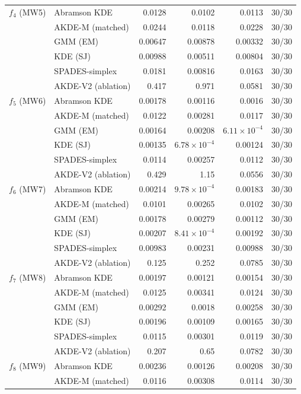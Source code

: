 \begin{tabular}{llrrrr}
$f_{4}$ (MW5) & Abramson KDE & 0.0128 & 0.0102 & 0.0113 & 30/30 \\
 & AKDE-M (matched) & 0.0244 & 0.0118 & 0.0228 & 30/30 \\
 & GMM (EM) & 0.00647 & 0.00878 & 0.00332 & 30/30 \\
 & KDE (SJ) & 0.00988 & 0.00511 & 0.00804 & 30/30 \\
 & SPADES-simplex & 0.0181 & 0.00816 & 0.0163 & 30/30 \\
 & AKDE-V2 (ablation) & 0.417 & 0.971 & 0.0581 & 30/30 \\
$f_{5}$ (MW6) & Abramson KDE & 0.00178 & 0.00116 & 0.0016 & 30/30 \\
 & AKDE-M (matched) & 0.0122 & 0.00281 & 0.0117 & 30/30 \\
 & GMM (EM) & 0.00164 & 0.00208 & $6.11\times10^{-4}$ & 30/30 \\
 & KDE (SJ) & 0.00135 & $6.78\times10^{-4}$ & 0.00124 & 30/30 \\
 & SPADES-simplex & 0.0114 & 0.00257 & 0.0112 & 30/30 \\
 & AKDE-V2 (ablation) & 0.429 & 1.15 & 0.0556 & 30/30 \\
$f_{6}$ (MW7) & Abramson KDE & 0.00214 & $9.78\times10^{-4}$ & 0.00183 & 30/30 \\
 & AKDE-M (matched) & 0.0101 & 0.00265 & 0.0102 & 30/30 \\
 & GMM (EM) & 0.00178 & 0.00279 & 0.00112 & 30/30 \\
 & KDE (SJ) & 0.00207 & $8.41\times10^{-4}$ & 0.00192 & 30/30 \\
 & SPADES-simplex & 0.00983 & 0.00231 & 0.00988 & 30/30 \\
 & AKDE-V2 (ablation) & 0.125 & 0.252 & 0.0785 & 30/30 \\
$f_{7}$ (MW8) & Abramson KDE & 0.00197 & 0.00121 & 0.00154 & 30/30 \\
 & AKDE-M (matched) & 0.0125 & 0.00341 & 0.0124 & 30/30 \\
 & GMM (EM) & 0.00292 & 0.0018 & 0.00258 & 30/30 \\
 & KDE (SJ) & 0.00196 & 0.00109 & 0.00165 & 30/30 \\
 & SPADES-simplex & 0.0115 & 0.00301 & 0.0119 & 30/30 \\
 & AKDE-V2 (ablation) & 0.207 & 0.65 & 0.0782 & 30/30 \\
$f_{8}$ (MW9) & Abramson KDE & 0.00236 & 0.00126 & 0.00208 & 30/30 \\
 & AKDE-M (matched) & 0.0116 & 0.00308 & 0.0114 & 30/30 \\

\end{tabular}
